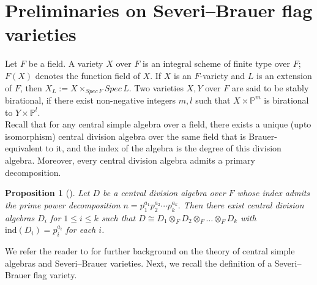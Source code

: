 \documentclass[10pt]{amsart}
\theoremstyle{plain}
\newtheorem{proposition}[thm]{Proposition}
\theoremstyle{definition}
\renewcommand{\P}{{\mathbb P}}
\begin{document}
\section{Preliminaries on Severi--Brauer flag varieties}\label{prelims}
Let \(F\) be a field. A variety \(X\) over \(F\) is an integral scheme of finite type over \(F\); \(F(X)\) denotes the function field of \(X\).  If \(X\) is an \(F\)-variety and \(L\) is an extension of \(F\), then \(X_L:= X \times_{Spec \, F} Spec \, L\). Two varieties \(X,Y\) over \(F\) are said to be stably birational, if there exist non-negative integers \(m,l\) such that \(X \times \P^m\) is birational to \(Y \times \P^l\). \\
Recall that for any central simple algebra over a field, there exists a unique (upto isomorphism) central division algebra over the same field that is Brauer-equivalent to it, and the index of the algebra is the degree of this division algebra. Moreover, every central division algebra admits a primary decomposition.
\begin{proposition}[{\cite[Proposition 4.5.16]{Gille_Szamuely_2006}}]\label{primary decomposition}
  Let \(D\) be a central division algebra over \(F\) whose index admits the prime power
decomposition \(n = p_1^{a_1} p_2^{a_2} \cdots p_k^{a_k}.\) Then there exist central division algebras \(D_i\) for \(1 \leq i \leq k\) such that \(D \cong D_1 \otimes_F D_2 \otimes_F \dots \otimes_F D_k\) with \(\mathrm{ind}(D_i)=p_i^{a_i}\) for each \(i\).  
\end{proposition}
We refer the reader to \cite{Gille_Szamuely_2006} for further background on the theory of central simple algebras and Severi–Brauer varieties. Next, we recall the definition of a Severi--Brauer flag variety.
\end{document}
